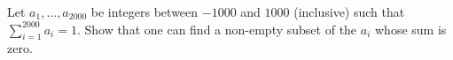 Let $a_1, \ldots, a_{2000}$ be integers between $-1000$ and $1000$ (inclusive) such that $\sum_{i=1}^{2000} a_i = 1$. Show that one can find a non-empty subset of the $a_i$ whose sum is zero.
